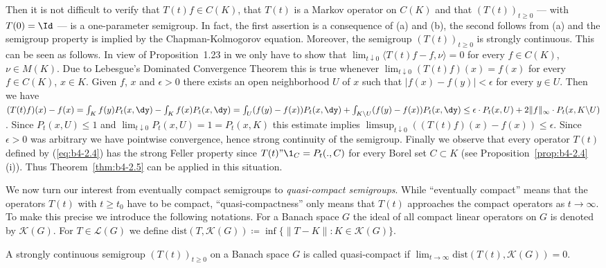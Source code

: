 \begin{example}
	Then it is not difficult to verify that $T(t)f \in C(K)$, that $T(t)$ is
	a Markov operator on $C(K)$ and that $(T(t))_{t \geq 0}$ --- with $T(0) = \Id $ --- is
	a one-parameter semigroup.
	In fact, the first assertion is a consequence of (a) and (b), the second follows from (a) and the semigroup
	property is implied by the Chapman-Kolmogorov equation.
%
%
%
\newpage
Moreover, the semigroup $(T(t))_{t \geq 0}$ is strongly continuous.
This can
be seen as follows. 
In view of Proposition~1.23 in \citet{davies:1980} we only have
to show that $\lim_{t\downarrow 0}\langle T(t)f-f,\nu\rangle = 0$ for every $f \in C(K)$, $\nu \in M(K)$.
Due to Lebesgue's Dominated Convergence Theorem this is true whenever
$\lim_{t\downarrow0}(T(t)f)(x) = f(x)$ for every $f \in C(K)$, $x \in K$.
Given $f$, $x$
and $\epsilon > 0$ there exists an open neighborhood $U$ of $x$ such that
$|f(x) - f(y)| < \epsilon$ for every $y \in U$.
Then we have
$(T(t)f)(x) - f(x) = \int_K f(y)P_t(x,\dy) - \int_K f(x)P_t(x,\dy) = 
\int_U (f(y)-f(x))P_t(x,\dy) + \int_{K\backslash U} (f(y)-f(x))P_t(x,\dy) \leq
\epsilon\cdot P_t(x,U) + 2\|f\|_{\infty}\cdot P_t(x,K\backslash U)$.
Since $P_t(x,U) \leq 1$ and $\lim_{t\downarrow0} P_t(x,U) = 1 = P_t(x,K)$ this estimate
implies $\limsup_{t\downarrow0}((T(t)f)(x) - f(x)) \leq \epsilon$.
Since $\epsilon > 0$ was arbitrary we have pointwise convergence, hence strong continuity of the semigroup.
Finally we observe that every operator $T(t)$ defined by (\ref{eq:b4-2.4}) has the
strong Feller property since $T(t)"\1_C = P_t(.,C)$ for every Borel set
$C \subset K$ (see Proposition~\ref{prop:b4-2.4}(i)).
Thus Theorem~\ref{thm:b4-2.5} can be applied in this situation.
\end{example}

We now turn our interest from eventually compact semigroups to \emph{quasi-compact semigroups}.
While \enquote{eventually compact} means that the operators $T(t)$ with $t \geq t_{0}$ have to be compact, \enquote{quasi-compactness} only
means that $T(t)$ approaches the compact operators as $t \to \infty$.
To make this precise we introduce the following notations.
For a Banach space $G$ the ideal of all compact linear operators on $G$ is denoted by $\mathcal{K}(G)$.
For $T \in \mathcal{L}(G)$ we define
$\text{dist}(T,\mathcal{K}(G))  \coloneq  \inf\{\|T - K\| \colon K \in \mathcal{K}(G)\}$.

\begin{definition}\label{def:b4-2.7}
	A strongly continuous semigroup $(T(t))_{t \geq 0}$ on a Banach
	space $G$ is called quasi-compact if $\lim_{t\to\infty}\text{dist}(T(t),\mathcal{K}(G)) = 0$.
\end{definition}

